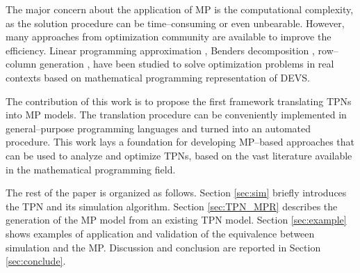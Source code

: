 \documentclass[suppldata]{interact}
\theoremstyle{plain}
\theoremstyle{definition}
\theoremstyle{remark}
\begin{document}
The major concern about the application of MP is the computational complexity, %
as the solution procedure can be time--consuming or even unbearable. However, many approaches from optimization community are available to improve the efficiency. Linear programming approximation \citep{alfieri2012mathematical}, Benders decomposition \citep{weiss2015buffer}, row--column generation \citep{alfieri2020time}, have been studied to solve optimization problems in %
real contexts based on mathematical programming representation of DEVS.


The contribution of this work is to propose the first framework translating TPNs into MP models. The translation procedure can be conveniently implemented in general--purpose programming languages and turned into an automated procedure. This work lays a foundation %
for developing MP--based approaches %
that can be used to analyze and optimize TPNs, based on the vast literature available in the mathematical programming field. 


The rest of the paper is organized as follows. Section \ref{sec:sim} briefly introduces the TPN and its simulation algorithm. Section \ref{sec:TPN_MPR} describes the generation of the MP model from an existing TPN model. Section \ref{sec:example} shows examples of application and validation of the equivalence between simulation and the MP. Discussion and conclusion are reported in Section \ref{sec:conclude}.







\end{document}
